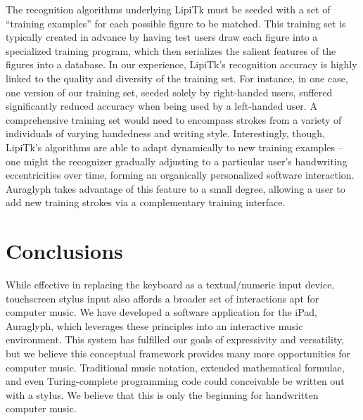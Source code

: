 \documentclass{nime-alternate}
\begin{document}
The recognition algorithms underlying LipiTk must be seeded with a set of ``training examples'' for each possible figure to be matched. 
This training set is typically created in advance by having test users draw each figure into a specialized training program, which then serializes the salient features of the figures into a database. 
In our experience, LipiTk's recognition accuracy is highly linked to the quality and diversity of the training set. 
For instance, in one case, one version of our training set, seeded solely by right-handed users, suffered significantly reduced accuracy when being used by a left-handed user. 
A comprehensive training set would need to encompass strokes from a variety of individuals of varying handedness and writing style. 
Interestingly, though, LipiTk's algorithms are able to adapt dynamically to new training examples -- one might the recognizer gradually adjusting to a particular user's handwriting eccentricities over time, forming an organically personalized software interaction. 
Auraglyph takes advantage of this feature to a small degree, allowing a user to add new training strokes via a complementary training interface. 

\section{Conclusions}
\label{sec:Conclusions}

While effective in replacing the keyboard as a textual/numeric input device, touchscreen stylus input also affords a broader set of interactions apt for computer music. 
We have developed a software application for the iPad, Auraglyph, which leverages these principles into an interactive music environment. 
This system has fulfilled our goals of expressivity and versatility, but we believe this conceptual framework provides many more opportunities for computer music. 
Traditional music notation, extended mathematical formulae, and even Turing-complete programming code could conceivable be written out with a stylus. 
We believe that this is only the beginning for handwritten computer music. 


%

%
%


\end{document}
